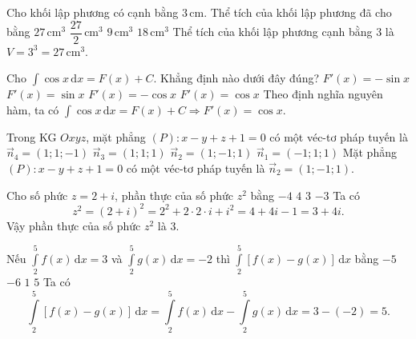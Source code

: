 \begin{ex}%
Cho khối lập phương có cạnh bằng $3\,\text{cm}$. Thể tích của khối lập phương đã cho bằng
\choice
{\True $27\,\text{cm}^3$}
{$\dfrac{27}{2}\,\text{cm}^3$}
{$9\,\text{cm}^3$}
{$18\,\text{cm}^3$}
\loigiai
{Thể tích của khối lập phương cạnh bằng $3$ là $V=3^3=27\,\text{cm}^3$.
}
\end{ex}

\begin{ex}%
Cho $\displaystyle\int\cos x\mathrm{\,d}x=F(x)+C$. Khẳng định nào dưới đây đúng?
\choice
{$F'(x)=-\sin x$}
{$F'(x)=\sin x$}
{$F'(x)=-\cos x$}
{\True $F'(x)=\cos x$}
\loigiai
{Theo định nghĩa nguyên hàm, ta có $\displaystyle\int\cos x\mathrm{\,d}x=F(x)+C\Rightarrow F'(x)=\cos x$.
}
\end{ex}

\begin{ex}%
Trong KG $Oxyz$, mặt phẳng $(P)\colon x-y+z+1=0$ có một véc-tơ pháp tuyến là
\choice
{$\overrightarrow{n}_4=(1;1;-1)$}
{$\overrightarrow{n}_3=(1;1;1)$}
{\True $\overrightarrow{n}_2=(1;-1;1)$}
{$\overrightarrow{n}_1=(-1;1;1)$}
\loigiai
{Mặt phẳng $(P)\colon x-y+z+1=0$ có một véc-tơ pháp tuyến là $\overrightarrow{n}_2=(1;-1;1)$.
}
\end{ex}

\begin{ex}%
Cho số phức $z=2+i$, phần thực của số phức $z^2$ bằng
\choice
{$-4$}
{$4$}
{\True $3$}
{$-3$}
\loigiai
{Ta có 
\[z^2=(2+i)^2=2^2+2\cdot 2\cdot i+i^2=4+4i-1=3+4i.\]
Vậy phần thực của số phức $z^2$ là 3.
}
\end{ex}

\begin{ex}%
Nếu $\displaystyle\int\limits_2^5 f(x)\mathrm{\,d}x=3$ và $\displaystyle\int\limits_2^5 g(x)\mathrm{\,d}x=-2$ thì $\displaystyle\int\limits_2^5 [f(x)-g(x)]\mathrm{\,d}x$ bằng
\choice
{$-5$}
{$-6$}
{$1$}
{\True $5$}
\loigiai
{Ta có \[\displaystyle\int\limits_2^5 [f(x)-g(x)]\mathrm{\,d}x=\displaystyle\int\limits_2^5 f(x)\mathrm{\,d}x-\displaystyle\int\limits_2^5 g(x)\mathrm{\,d}x=3-(-2)=5.\]
}
\end{ex}

